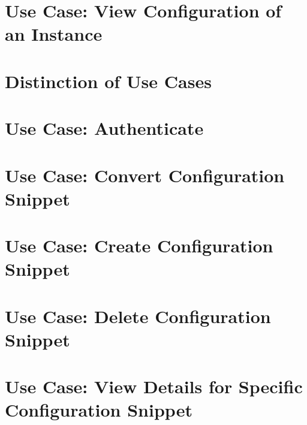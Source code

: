 \let\mypdfximage\pdfximage\def\pdfximage{\immediate\mypdfximage}\documentclass[twoside]{book}
\newcommand{\+}{\discretionary{\mbox{\scriptsize$\hookleftarrow$}}{}{}}
\begin{document}
\chapter{Use Case\+: View Configuration of an Instance}
\label{doc_usecases_elektra_web_UC_view_config_md}

\chapter{Distinction of Use Cases}
\label{doc_usecases_snippet_sharing_distinction_use_cases_md}

\chapter{Use Case\+: Authenticate}
\label{doc_usecases_snippet_sharing_UC_authenticate_md}

\chapter{Use Case\+: Convert Configuration Snippet}
\label{doc_usecases_snippet_sharing_UC_convert_snippet_md}

\chapter{Use Case\+: Create Configuration Snippet}
\label{doc_usecases_snippet_sharing_UC_create_snippet_md}

\chapter{Use Case\+: Delete Configuration Snippet}
\label{doc_usecases_snippet_sharing_UC_delete_snippet_md}

\chapter{Use Case\+: View Details for Specific Configuration Snippet}
\label{doc_usecases_snippet_sharing_UC_details_snippet_md}

\end{document}
